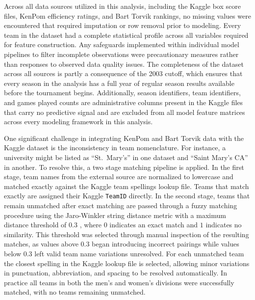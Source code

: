 \documentclass[12pt,leqno]{article}\usepackage[pdftex]{graphicx}\usepackage[dvipsnames]{xcolor}
\theoremstyle{remark}
\begin{document}
Across all data sources utilized in this analysis, including the Kaggle box score files, KenPom efficiency ratings, and Bart Torvik rankings, no missing values were encountered that required imputation or row removal prior to modeling. Every team in the dataset had a complete statistical profile across all variables required for feature construction. Any safeguards implemented within individual model pipelines to filter incomplete observations were precautionary measures rather than responses to observed data quality issues. The completeness of the dataset across all sources is partly a consequence of the 2003 cutoff, which ensures that every season in the analysis has a full year of regular season results available before the tournament begins. Additionally, season identifiers, team identifiers, and games played counts are administrative columns present in the Kaggle files that carry no predictive signal and are excluded from all model feature matrices across every modeling framework in this analysis.

One significant challenge in integrating KenPom and Bart Torvik data with the Kaggle dataset is the inconsistency in team nomenclature. For instance, a university might be listed as ``St.\ Mary's'' in one dataset and ``Saint Mary's CA'' in another. To resolve this, a two stage matching pipeline is applied. In the first stage, team names from the external source are normalized to lowercase and matched exactly against the Kaggle team spellings lookup file. Teams that match exactly are assigned their Kaggle \texttt{TeamID} directly. In the second stage, teams that remain unmatched after exact matching are passed through a fuzzy matching procedure using the Jaro-Winkler string distance metric with a maximum distance threshold of $0.3$ \cite{JW}, where $0$ indicates an exact match and $1$ indicates no similarity. This threshold was selected through manual inspection of the resulting matches, as values above $0.3$ began introducing incorrect pairings while values below $0.3$ left valid team name variations unresolved. For each unmatched team the closest spelling in the Kaggle lookup file is selected, allowing minor variations in punctuation, abbreviation, and spacing to be resolved automatically. In practice all teams in both the men's and women's divisions were successfully matched, with no teams remaining unmatched.
\newpage

\end{document}
